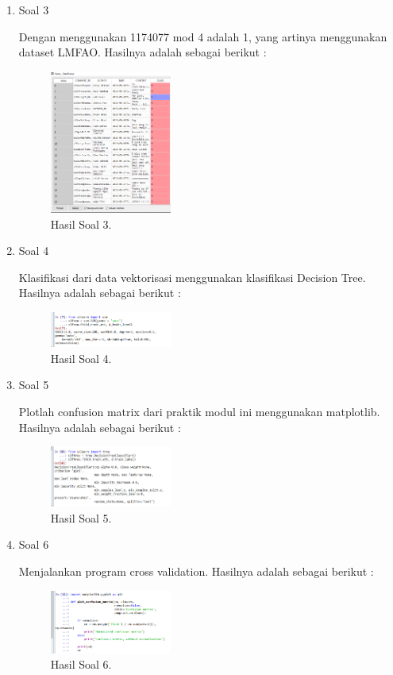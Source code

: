 \begin{enumerate}
	\item Soal 3
	\hfill\break
	
	Dengan menggunakan 1174077 mod 4 adalah 1, yang artinya menggunakan dataset LMFAO. Hasilnya adalah sebagai berikut :
	\begin{figure}[H]
	\centering
		\includegraphics[width=4cm]{figures/1174077/4/materi/hasil31.PNG}
		\caption{Hasil Soal 3.}
	\end{figure}

	\item Soal 4
	\hfill\break
	
	Klasifikasi dari data vektorisasi menggunakan klasifikasi Decision Tree. Hasilnya adalah sebagai berikut :
	\begin{figure}[H]
	\centering
		\includegraphics[width=4cm]{figures/1174077/4/materi/hasil4.PNG}
		\caption{Hasil Soal 4.}
	\end{figure}

	\item Soal 5
	\hfill\break
	
	Plotlah confusion matrix dari praktik modul ini menggunakan matplotlib. Hasilnya adalah sebagai berikut :
	\begin{figure}[H]
	\centering
		\includegraphics[width=4cm]{figures/1174077/4/materi/hasil5.PNG}
		\caption{Hasil Soal 5.}
	\end{figure}

	\item Soal 6
	\hfill\break
	
	Menjalankan program cross validation. Hasilnya adalah sebagai berikut :
	\begin{figure}[H]
	\centering
		\includegraphics[width=4cm]{figures/1174077/4/materi/hasil6.PNG}
		\caption{Hasil Soal 6.}
	\end{figure}


\end{enumerate}
